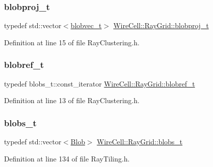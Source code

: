 \subsubsection{\texorpdfstring{blobproj\+\_\+t}{blobproj\_t}}
{\footnotesize\ttfamily typedef std\+::vector$<$\hyperlink{namespace_wire_cell_1_1_ray_grid_a3154c64db4d07056418dfcd1afbf0531}{blobvec\+\_\+t}$>$ \hyperlink{namespace_wire_cell_1_1_ray_grid_a2495e73e12fdf4e81ffef9d99f8a8e22}{Wire\+Cell\+::\+Ray\+Grid\+::blobproj\+\_\+t}}



Definition at line 15 of file Ray\+Clustering.\+h.

\mbox{\label{namespace_wire_cell_1_1_ray_grid_abed76699c704f53d6c4ce912da18050b}} 
\subsubsection{\texorpdfstring{blobref\+\_\+t}{blobref\_t}}
{\footnotesize\ttfamily typedef blobs\+\_\+t\+::const\+\_\+iterator \hyperlink{namespace_wire_cell_1_1_ray_grid_abed76699c704f53d6c4ce912da18050b}{Wire\+Cell\+::\+Ray\+Grid\+::blobref\+\_\+t}}



Definition at line 13 of file Ray\+Clustering.\+h.

\mbox{\label{namespace_wire_cell_1_1_ray_grid_aea2069aff62790df3241ee7446e81ade}} 
\subsubsection{\texorpdfstring{blobs\+\_\+t}{blobs\_t}}
{\footnotesize\ttfamily typedef std\+::vector$<$\hyperlink{class_wire_cell_1_1_ray_grid_1_1_blob}{Blob}$>$ \hyperlink{namespace_wire_cell_1_1_ray_grid_aea2069aff62790df3241ee7446e81ade}{Wire\+Cell\+::\+Ray\+Grid\+::blobs\+\_\+t}}



Definition at line 134 of file Ray\+Tiling.\+h.

\mbox{\label{namespace_wire_cell_1_1_ray_grid_a3610973c19231cca55e15d0a8055e079}} 
